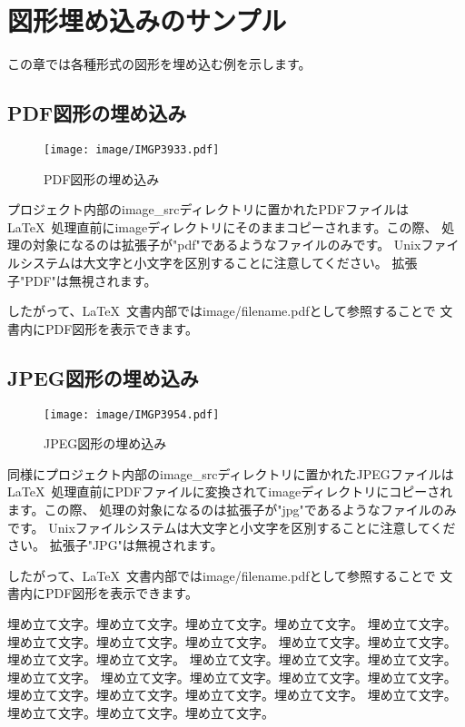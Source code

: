 \chapter{図形埋め込みのサンプル}
\label{sec:figure_sample}

この章では各種形式の図形を埋め込む例を示します。

\section{PDF図形の埋め込み}
\begin{wrapfigure}[9]{O}[0pt]{0\textwidth}
    \texttt{[image: image/IMGP3933.pdf]}
    \caption{PDF図形の埋め込み}\label{embeded_pdf}
\end{wrapfigure}

プロジェクト内部のimage\_srcディレクトリに置かれたPDFファイルは\LaTeX\
処理直前にimageディレクトリにそのままコピーされます。この際、
処理の対象になるのは拡張子が"pdf"であるようなファイルのみです。
Unixファイルシステムは大文字と小文字を区別することに注意してください。
拡張子"PDF"は無視されます。

したがって、\LaTeX\ 文書内部ではimage/filename.pdfとして参照することで
文書内にPDF図形を表示できます。

\section{JPEG図形の埋め込み}

\begin{wrapfigure}[9]{O}[0pt]{0\textwidth}
    \texttt{[image: image/IMGP3954.pdf]}
    \caption{JPEG図形の埋め込み}\label{embeded_jpeg}
\end{wrapfigure}

同様にプロジェクト内部のimage\_srcディレクトリに置かれたJPEGファイルは\LaTeX\
処理直前にPDFファイルに変換されてimageディレクトリにコピーされます。この際、
処理の対象になるのは拡張子が"jpg"であるようなファイルのみです。
Unixファイルシステムは大文字と小文字を区別することに注意してください。
拡張子"JPG"は無視されます。

したがって、\LaTeX\ 文書内部ではimage/filename.pdfとして参照することで
文書内にPDF図形を表示できます。

埋め立て文字。埋め立て文字。埋め立て文字。埋め立て文字。
埋め立て文字。埋め立て文字。埋め立て文字。埋め立て文字。
埋め立て文字。埋め立て文字。埋め立て文字。埋め立て文字。
埋め立て文字。埋め立て文字。埋め立て文字。埋め立て文字。
埋め立て文字。埋め立て文字。埋め立て文字。埋め立て文字。
埋め立て文字。埋め立て文字。埋め立て文字。埋め立て文字。
埋め立て文字。埋め立て文字。埋め立て文字。埋め立て文字。

